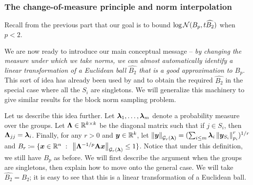 \documentclass[11pt]{article}
\numberwithin{equation}{section}
\begin{document}
\subsubsection{The change-of-measure principle and norm interpolation}
\label{sec:overview_measure}

Recall from the previous part that our goal is to bound $\log\mathcal{N}(B_p,t\widehat{B_2})$ when $p < 2$.

We are now ready to introduce our main conceptual message -- \textit{by changing the measure under which we take norms, we can almost automatically identify a linear transformation of a Euclidean ball $\widehat{B_2}$ that is a good approximation to $B_p$}. This sort of idea has already been used by \citet{blm89} and \citet{sz01} to obtain the required $\widehat{B_2}$ in the special case where all the $S_i$ are singletons. We will generalize this machinery to give similar results for the block norm sampling problem.

Let us describe this idea further. Let $\bm{\lambda}_1,\dots,\bm{\lambda}_m$ denote a probability measure over the groups. Let $\mathbf{\Lambda} \in \mathbb{R}^{k\times k}$ be the diagonal matrix such that if $j \in S_i$, then $\mathbf{\Lambda}_{jj} = \bm{\lambda}_i$. Finally, for any $r > 0$ and $\bm{y}\in\mathbb{R}^k$, let $\left\lVert \bm{y} \right\rVert_{\mathcal{G}_{r}(\bm{\lambda})} = (\sum_{i \le m} \bm{\lambda}_i\left\lVert \bm{y}_{S_i} \right\rVert_{p_i}^{r})^{1/r}$ and $B_r \coloneqq \{\bm{x}\in\mathbb{R}^n {\;\; : \;\;} \left\lVert \mathbf{\Lambda}^{-1/p}\mathbf{A}\bm{x} \right\rVert_{\mathcal{G}_{r}(\bm{\lambda})} \le 1\}$. Notice that under this definition, we  still have \(B_p\) as before. We will first describe the argument when the groups are singletons, then explain how to move onto the general case. We will take $\widehat{B_2} = B_2$; it is easy to see that this is a linear transformation of a Euclidean ball.
\end{document}
